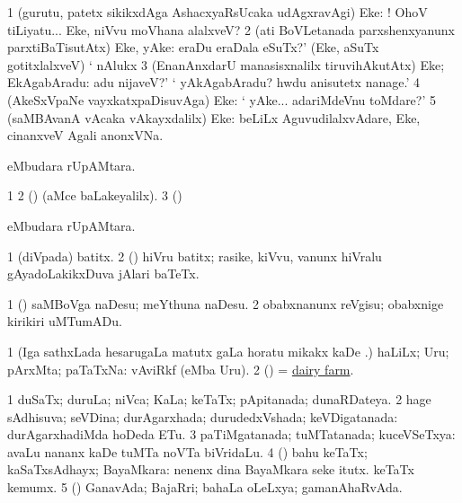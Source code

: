 \bentry
{} 
\gl{\BAavayx}
\bmng
\bnum
\num{1} (gurutu, patetx sikikxdAga AshacxyaRsUcaka udAgxravAgi) Eke: ! OhoV tiLiyatu... Eke, niVvu moVhana alalxveV? 
\num{2} (ati BoVLetanada parxshenxyanunx parxtiBaTisutAtx) Eke, yAke:  eraDu eraDala eSuTx?' (Eke, aSuTx gotitxlalxveV) ` nAlukx 
\num{3} (EnanAnxdarU manasisxnalilx tiruvihAkutAtx) Eke; EkAgabAradu:  adu nijaveV?' ` yAkAgabAradu? hwdu anisutetx nanage.' 
\num{4} (AkeSxVpaNe vayxkatxpaDisuvAga) Eke:  ` yAke... adariMdeVnu toMdare?' 
\num{5} (saMBAvanA vAcaka vAkayxdalilx) Eke:  beLiLx AguvudilalxvAdare, Eke, cinanxveV Agali anonxVNa. 
\enum
\emng
\eentry

\bentry
{}
\gl{\nA}
\bmng
{} eMbudara rUpAMtara. 
\emng
\eentry

\bentry
{}
\gl{\saMkiSx}
\bmng
\bnum
\num{1}  
\num{2} (\ame)  (aMce baLakeyalilx). 
\num{3} (\birx)  
\enum
\emng
\eentry

\bentry
{}
\gl{\sapUpa}
\bmng
{} eMbudara rUpAMtara. 
\emng
\eentry

\bentry
{} 
\gl{\nA}
\expl{}
\bmng
\bnum
\num{1} (diVpada) batitx. 
\num{2} (\shaveY) hiVru batitx; rasike, kiVvu, \mo vanunx hiVralu gAyadoLakikxDuva jAlari baTeTx. 
\enum
\emng

\noindent 
\gl{\pagu}
\bmng
\bnum
\num{1}  (\ashi) saMBoVga naDesu; meYthuna naDesu. 
\num{2}  obabxnanunx reVgisu; obabxnige kirikiri uMTumADu. 
\enum
\emng
\eentry

\bentry
{} 
\gl{\nA}
\bmng
\bnum
\num{1} (Iga sathxLada hesarugaLa matutx \saMpa gaLa horatu mikakx kaDe \pArxM.) haLiLx; Uru; pArxMta; paTaTxNa:  vAviRkf (eMba Uru). 
\num{2} (\pArxM) = \hyperref{kandict_d.pdf}{D}{dairy farm}{dairy farm}. 
\enum
\emng
\eentry

\bentry
{}
\gl{\gu} 
\bmng
\bnum
\num{1} duSaTx; duruLa; niVca; KaLa; keTaTx; pApitanada; dunaRDateya. 
\num{2} hage sAdhisuva; seVDina; durAgarxhada; durudedxVshada; keVDigatanada:  durAgarxhadiMda hoDeda ETu. 
\num{3} paTiMgatanada; tuMTatanada; kuceVSeTxya:  avaLu nananx kaDe tuMTa noVTa biVridaLu. 
\num{4} (\AmA) bahu keTaTx; kaSaTxsAdhayx; BayaMkara:  nenenx dina BayaMkara seke itutx.  keTaTx kemumx. 
\num{5} (\ashi) GanavAda; BajaRri; bahaLa oLeLxya; gamanAhaRvAda. 
\enum
\emng

